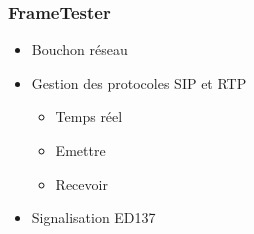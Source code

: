 \begin{frame}
    \frametitle{FrameTester}
    \begin{itemize}
        \item Bouchon réseau
        \item Gestion des protocoles SIP et RTP
            \begin{itemize}
                \item Temps réel
                \item Emettre
                \item Recevoir
            \end{itemize}
        \item Signalisation ED137
    \end{itemize}
\end{frame}